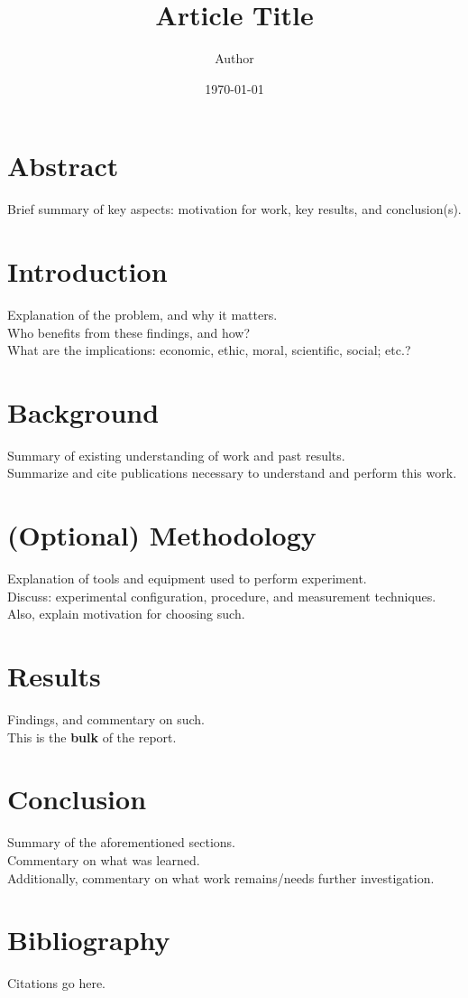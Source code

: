 \documentclass[11pt]{article}
\title{Article Title}
\author{Author}
\date{\today}
\begin{document}
\maketitle

\section*{Abstract}
Brief summary of key aspects: motivation for work, key results, and conclusion(s).\par
%
\section{Introduction}
Explanation of the problem, and why it matters.\\
Who benefits from these findings, and how?\\
What are the implications: economic, ethic, moral, scientific, social; etc.?\par
%
\section{Background}
Summary of existing understanding of work and past results.\\
Summarize and cite publications necessary to understand and perform this work.\par
%
\section{(Optional) Methodology}
Explanation of tools and equipment used to perform experiment.\\
Discuss: experimental configuration, procedure, and measurement techniques.\\
Also, explain motivation for choosing such.\par
%
\section{Results}
Findings, and commentary on such.\\
This is the \textbf{bulk} of the report.\par
%
\section{Conclusion}
Summary of the aforementioned sections.\\
Commentary on what was learned.\\
Additionally, commentary on what work remains/needs further investigation.\par
%
\section*{Bibliography}
Citations go here.
\end{document}
